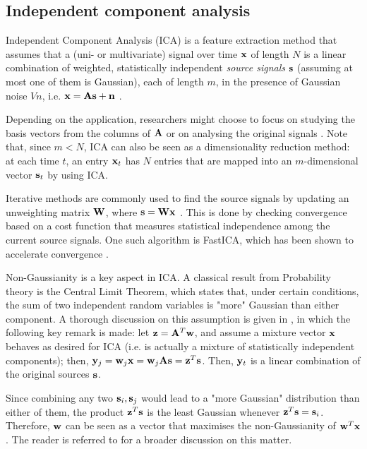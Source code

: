 \documentclass[../main.tex]{subfiles}
\begin{document}
\subsection{Independent component analysis} \label{subsection_ica}
Independent Component Analysis (ICA) is a feature extraction method that assumes that a (uni- or multivariate) signal over time $\mathbf{x}$ of length $N$ is a linear combination of weighted, statistically independent \emph{source signals} $\mathbf{s}$ (assuming at most one of them is Gaussian), each of length $m$, in the presence of Gaussian noise $V{n}$, i.e. $\mathbf{x} = \mathbf{As} + \mathbf{n}$ \cite{Kasprzak}.
\par Depending on the application, researchers might choose to focus on studying the basis vectors from the columns of $\mathbf{A}$ or on analysing the original signals \cite{Kasprzak,Hsieh2009,Chien2006,Jang2001}. Note that, since $m<N$, ICA can also be seen as a dimensionality reduction method: at each time $t$, an entry $\mathbf{x}_t$ has $N$ entries that are mapped into an $m$-dimensional vector $\mathbf{s}_t$ by using ICA. 
\par Iterative methods are commonly used to find the source signals by updating an unweighting matrix $\mathbf{W}$, where $\mathbf{s} = \mathbf{Wx}$ \cite{Hyvarinen2000}. This is done by checking convergence based on a cost function that measures statistical independence among the current source signals. One such algorithm is FastICA, which has been shown to accelerate convergence \cite{Hyvarinen2000, Kasprzak}. 
\par Non-Gaussianity is a key aspect in ICA. A classical result from Probability theory is the Central Limit Theorem, which states that, under certain conditions, the sum of two independent random variables is "more" Gaussian than either component. A thorough discussion on this assumption is given in \cite{Hyvarinen2000}, in which the following key remark is made: let $\mathbf{z} = \mathbf{A}^T\mathbf{w}$, and assume a mixture vector $\mathbf{x}$ behaves as desired for ICA (i.e. is actually a mixture of statistically independent components); then, $\mathbf{y}_j = \mathbf{w}_j\mathbf{x} = \mathbf{w}_j\mathbf{As} = \mathbf{z}^T\mathbf{s}$. Then, $\mathbf{y}_t$ is a linear combination of the original sources $\mathbf{s}$. 
\par Since combining any two $\mathbf{s}_i, \mathbf{s}_j$ would lead to a "more Gaussian" distribution than either of them, the product $\mathbf{z}^T\mathbf{s}$ is the least Gaussian whenever $\mathbf{z}^T\mathbf{s} = \mathbf{s}_i$. Therefore, $\mathbf{w}$ can be seen as a vector that maximises the non-Gaussianity of $\mathbf{w}^T\mathbf{x}$. The reader is referred to \cite{Hyvarinen2000} for a broader discussion on this matter.
\end{document}
